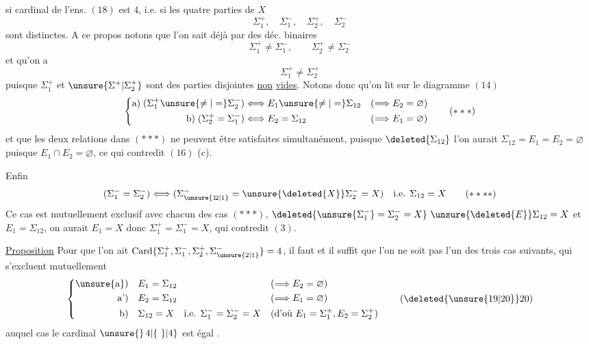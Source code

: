 \begingroup\makeatletter\tagsleft@true\makeatother
si  cardinal de l'ens. $(18)$ est $4$, i.e. si les quatre parties de $X$
\[
\Sigma_1^+,\quad\Sigma_1^-,\quad\Sigma_2^+,\quad\Sigma_2^-
\]
sont distinctes. A ce propos notons que l'on sait déjà par   des déc. binaires
\[
\Sigma_1^+\ne\Sigma_1^-,\qquad\Sigma_2^+\ne\Sigma_2^-
\tag*{($*$)}
\]
et qu'on a
\[
\Sigma_1^+\ne\Sigma_2^+
\tag*{($**$)}
\]
puisque $\Sigma_1^+$ et $\unsure{\Sigma^+|\Sigma_2^+}$ sont des parties disjointes \uline{non} \uline{vides}. Notons donc qu'on lit sur le diagramme $(14)$
\[
\left\{\begin{aligned}
\text{a)}\;(\Sigma_1^+\unsure{\ne|=}\Sigma_2^-)&\Longleftrightarrow E_1\unsure{\ne|=}\Sigma_{12}
   &(\Longrightarrow E_2=\varnothing)\\
\text{b)}\;(\Sigma_2^+=\Sigma_1^-)&\Longleftrightarrow E_2=\Sigma_{12}
   &(\Longrightarrow E_1=\varnothing)
\end{aligned}\right.
\tag*{($***$)}
\]
et que les deux relations   dans $(***)$ ne peuvent être satisfaites simultanément, puisque $\deleted{\Sigma_{12}}$ l'on aurait $\Sigma_{12}=E_1=E_2=\varnothing$ puisque $E_1\cap E_2=\varnothing$, ce qui contredit $(16)$ (c).

Enfin
\[
(\Sigma_1^-=\Sigma_2^-)\Longleftrightarrow
(\Sigma_{\unsure{1\!2|1}}^-=\unsure{\deleted{X}}\Sigma_2^-=X)
\quad\text{i.e. }\Sigma_{12}=X
\tag*{($****$)}
\]
Ce cas est mutuellement exclusif avec chacun des cas $(***)$,   $\deleted{\unsure{\Sigma_1^-}=\Sigma_2^-=X}\ \unsure{\deleted{E}}\Sigma_{12}=X$ et $E_1=\Sigma_{12}$, on aurait $E_1=X$ donc $\Sigma_1^+=\Sigma_1^-=X$,  qui contredit $(3)$.

\uline{Proposition} Pour que l'on ait $\operatorname{Card}\{\Sigma_1^+,\Sigma_1^-,\Sigma_2^+,\Sigma_{\unsure{2|1}}^-\}=4$, il faut et il suffit que l'on ne soit pas l'un des trois cas suivants, qui s'excluent mutuellement
\[
\left\{\begin{aligned}
\text{\unsure{a})}\quad &E_1=\Sigma_{12}&&(\Longrightarrow E_2=\varnothing)\\
\text{a')}\quad &E_2=\Sigma_{12}&&(\Longrightarrow E_1=\varnothing)\\
\text{b)}\quad &\Sigma_{12}=X\quad\text{i.e. }\Sigma_1^-=\Sigma_2^-=X
   &&(\text{d'où }E_1=\Sigma_1^+,E_2=\Sigma_2^+)
\end{aligned}\right.
\tag*{(\deleted{\unsure{19|20}}20)}
\]
auquel cas le cardinal  $\unsure{\}\,4|\{\ \}|4}$ est égal  .

\endgroup
\clearpage
